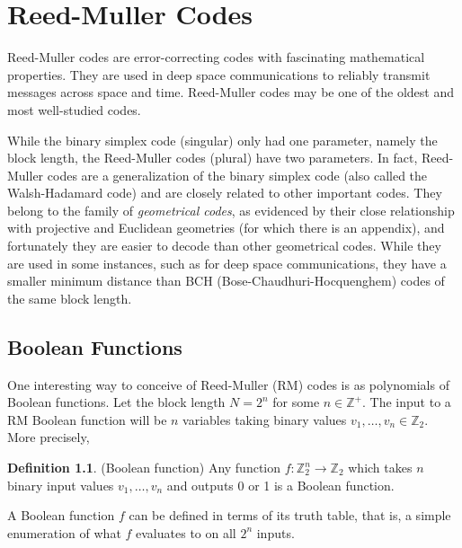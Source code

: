 \documentclass[12pt,twoside]{reedthesis}
\theoremstyle{definition}
\newtheorem{definition}[theorem]{Definition}
\newcommand{\Z}{\mathbb{Z}}
\begin{document}
\chapter{Reed-Muller Codes}
Reed-Muller codes are error-correcting codes with fascinating mathematical properties.  They are used in deep space communications to reliably transmit messages across space and time. Reed-Muller codes may be one of the oldest and most well-studied codes.

While the binary simplex code (singular) only had one parameter, namely the block length, the Reed-Muller codes (plural) have two parameters. In fact, Reed-Muller codes are a generalization of the binary simplex code (also called the Walsh-Hadamard code) and are closely related to other important codes. They belong to the family of \textit{geometrical codes}, as evidenced by their close relationship with projective and Euclidean geometries (for which there is an appendix), and fortunately they are easier to decode than other geometrical codes. While they are used in some instances, such as for deep space communications, they have a smaller minimum distance than BCH (Bose-Chaudhuri-Hocquenghem) codes of the same block length.


\section{Boolean Functions}
One interesting way to conceive of Reed-Muller (RM) codes is as polynomials of Boolean functions. Let the block length $N = 2^n$ for some $n\in \Z^+$. The input to a RM Boolean function will be $n$ variables taking binary values $v_1, \ldots, v_n \in \Z_2$. More precisely,

\begin{definition}(Boolean function) Any function $f: \Z_2^n \rightarrow \Z_2$ which takes $n$ binary input values $v_1, \ldots, v_n$ and outputs 0 or 1 is a Boolean function.
\end{definition}

A Boolean function $f$ can be defined in terms of its truth table, that is, a simple enumeration of what $f$ evaluates to on all $2^n$ inputs.
\end{document}
